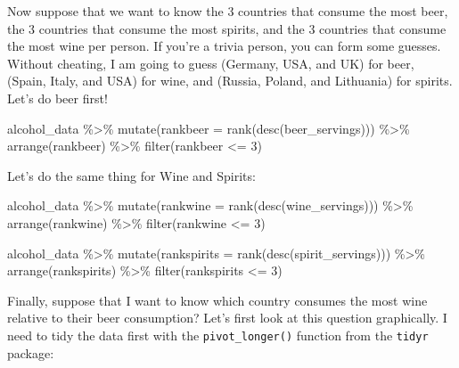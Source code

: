 \documentclass[
]{book}
\newenvironment{Shaded}{\begin{snugshade}}{\end{snugshade}}
\newcommand{\AttributeTok}[1]{\textcolor[rgb]{0.77,0.63,0.00}{#1}}
\newcommand{\DecValTok}[1]{\textcolor[rgb]{0.00,0.00,0.81}{#1}}
\newcommand{\FunctionTok}[1]{\textcolor[rgb]{0.00,0.00,0.00}{#1}}
\newcommand{\NormalTok}[1]{#1}
\newcommand{\SpecialCharTok}[1]{\textcolor[rgb]{0.00,0.00,0.00}{#1}}
\begin{document}
Now suppose that we want to know the 3 countries that consume the most beer, the 3 countries that consume the most spirits, and the 3 countries that consume the most wine per person. If you're a trivia person, you can form some guesses. Without cheating, I am going to guess (Germany, USA, and UK) for beer, (Spain, Italy, and USA) for wine, and (Russia, Poland, and Lithuania) for spirits. Let's do beer first!

\begin{Shaded}
\begin{Highlighting}[]
\NormalTok{alcohol\_data }\SpecialCharTok{\%\textgreater{}\%} \FunctionTok{mutate}\NormalTok{(}\AttributeTok{rankbeer =} \FunctionTok{rank}\NormalTok{(}\FunctionTok{desc}\NormalTok{(beer\_servings))) }\SpecialCharTok{\%\textgreater{}\%}
  \FunctionTok{arrange}\NormalTok{(rankbeer) }\SpecialCharTok{\%\textgreater{}\%} 
  \FunctionTok{filter}\NormalTok{(rankbeer }\SpecialCharTok{\textless{}=} \DecValTok{3}\NormalTok{)}
\end{Highlighting}
\end{Shaded}

Let's do the same thing for Wine and Spirits:

\begin{Shaded}
\begin{Highlighting}[]
\NormalTok{alcohol\_data }\SpecialCharTok{\%\textgreater{}\%} \FunctionTok{mutate}\NormalTok{(}\AttributeTok{rankwine =} \FunctionTok{rank}\NormalTok{(}\FunctionTok{desc}\NormalTok{(wine\_servings))) }\SpecialCharTok{\%\textgreater{}\%}
  \FunctionTok{arrange}\NormalTok{(rankwine) }\SpecialCharTok{\%\textgreater{}\%} 
  \FunctionTok{filter}\NormalTok{(rankwine }\SpecialCharTok{\textless{}=} \DecValTok{3}\NormalTok{)}

\NormalTok{alcohol\_data }\SpecialCharTok{\%\textgreater{}\%} \FunctionTok{mutate}\NormalTok{(}\AttributeTok{rankspirits =} \FunctionTok{rank}\NormalTok{(}\FunctionTok{desc}\NormalTok{(spirit\_servings))) }\SpecialCharTok{\%\textgreater{}\%}
  \FunctionTok{arrange}\NormalTok{(rankspirits) }\SpecialCharTok{\%\textgreater{}\%} 
  \FunctionTok{filter}\NormalTok{(rankspirits }\SpecialCharTok{\textless{}=} \DecValTok{3}\NormalTok{)}
\end{Highlighting}
\end{Shaded}

Finally, suppose that I want to know which country consumes the most wine relative to their beer consumption? Let's first look at this question graphically. I need to tidy the data first with the \texttt{pivot\_longer()} function from the \texttt{tidyr} package:
\end{document}

